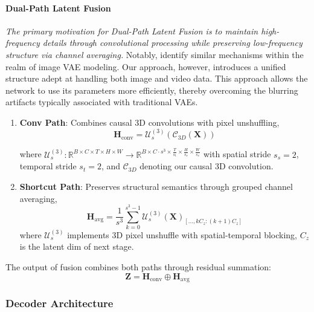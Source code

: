 \paragraph{Dual-Path Latent Fusion} 
\textit{The primary motivation for Dual-Path Latent Fusion is to maintain high-frequency details through convolutional processing while preserving low-frequency structure via channel averaging.} Notably, \cite{chen2025deep} identify similar mechanisms within the realm of image VAE modeling. Our approach, however, introduces a unified structure adept at handling both image and video data. This approach allows the network to use its parameters more efficiently, thereby overcoming the blurring artifacts typically associated with traditional VAEs.
\begin{enumerate}[left=0pt]
    \item \textbf{Conv Path}: Combines causal 3D convolutions with pixel unshuffling,
    \begin{equation}     
        \mathbf{H}_{\text{conv}} = \mathcal{U}^{(3)}_s\left(\mathcal{C}_{3D}(\mathbf{X})\right)
    \end{equation}

    where $\mathcal{U}^{(3)}_s: \mathbb{R}^{B \times C \times T \times H \times W} \to  \mathbb{R}^{B \times C \cdot s^3 \times \frac{T}{s_t} \times \frac{H}{s_s} \times \frac{W}{s_s}} $ with spatial stride $s_s=2$, temporal stride $s_t=2$, and $\mathcal{C}_{3D}$ denoting our causal 3D convolution.

    \item \textbf{Shortcut Path}: Preserves structural semantics through grouped channel averaging,
    \begin{equation} 
        \mathbf{H}_{\text{avg}} = \frac{1}{s^3}\sum_{k=0}^{s^3-1}\mathcal{U}^{(3)}_s(\mathbf{X})_{[...,kC_z:(k+1)C_z]}
    \end{equation}
    where $\mathcal{U}^{(3)}_s$ implements 3D pixel unshuffle with spatial-temporal blocking, $C_z$ is the latent dim of next stage.
\end{enumerate}

The output of fusion combines both paths through residual summation:
\begin{equation}  
    \mathbf{Z} = \mathbf{H}_{\text{conv}} \oplus \mathbf{H}_{\text{avg}}
\end{equation}




\subsubsection{Decoder Architecture}

